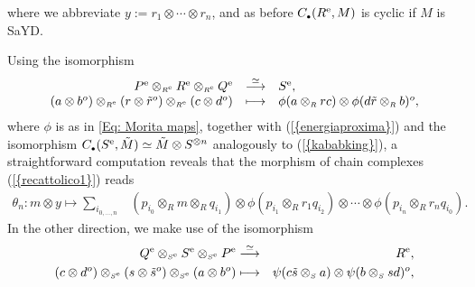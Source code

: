 \documentclass[reqno, a4paper, 10pt]{amsart}
\numberwithin{equation}{section}
\theoremstyle{plain}
\theoremstyle{definition}
\theoremstyle{remark}
\begin{document}
where we abbreviate $y:=r_1
\otimes \cdots \otimes r_n$, and as before $C_{{\scriptscriptstyle{\bullet}}}({{R^{\rm e}}},M)$ is
cyclic if $M$ is SaYD.

Using the isomorphism
\begin{equation}
\label{bancopopular}
\begin{array}{rcl}
{{P^{\rm e}}} \otimes_{{\scriptscriptstyle{{R^{\rm e}}}}} {{R^{\rm e}}} \otimes_{{\scriptscriptstyle{{R^{\rm e}}}}} {{Q^{\rm e}}} &\overset{\simeq}{\longrightarrow}& {{S^{\rm e}}}, \\
(a \otimes b^o) \otimes_{{\scriptscriptstyle{{R^{\rm e}}}}} (r \otimes {\tilde{{r}}}^o) \otimes_{{\scriptscriptstyle{{R^{\rm e}}}}} (c \otimes d^o)
&\longmapsto& \phi(a \otimes_{{\scriptscriptstyle{R}}} rc) \otimes \phi(d{\tilde{{r}}} \otimes_{{\scriptscriptstyle{R}}} b)^o, \\
\end{array}
\end{equation}
where $\phi$ is as in \eqref{Eq: Morita maps},
together with {{\rm (}\ref{{energiaproxima}}{\rm )}} and 
the isomorphism $C_{{\scriptscriptstyle{\bullet}}}({{S^{\rm e}}}, {\tilde{{M}}}) \simeq {\tilde{{M}}} \otimes S^{\otimes n}$ analogously to {{\rm (}\ref{{kababking}}{\rm )}}, 
a straightforward computation reveals that the morphism of chain complexes {{\rm (}\ref{{recattolico1}}{\rm )}} reads 
\begin{equation*}
\begin{split}
\theta_n: 
m \otimes y \longmapsto  \sum_{\scriptscriptstyle{i_{0, \ldots, n}}} 
 & (p_{i_0} \otimes_{{\scriptscriptstyle{R}}} m \otimes_{{\scriptscriptstyle{R}}} q_{i_1}) \otimes \phi(p_{i_1} \otimes_{{\scriptscriptstyle{R}}} r_1 q_{i_2}) \otimes \cdots \otimes \phi(p_{i_n} \otimes_{{\scriptscriptstyle{R}}} r_n q_{i_0}). 
\end{split}
\end{equation*}
In the other direction, we make use of the isomorphism 
\begin{eqnarray*}
{{Q^{\rm e}}} \otimes_{{\scriptscriptstyle{{S^{\rm e}}}}} {{S^{\rm e}}} \otimes_{{\scriptscriptstyle{{S^{\rm e}}}}} {{P^{\rm e}}} &\overset{\simeq}{\longrightarrow}& {{R^{\rm e}}}, \\
(c \otimes d^o) \otimes_{{\scriptscriptstyle{{S^{\rm e}}}}} (s \otimes {\tilde{{s}}}^o) \otimes_{{\scriptscriptstyle{{S^{\rm e}}}}} (a \otimes b^o)
&\longmapsto& \psi(c{\tilde{{s}}} \otimes_{{\scriptscriptstyle{S}}} a) \otimes \psi(b \otimes_{{\scriptscriptstyle{S}}} sd)^o,
\end{eqnarray*}
\end{document}
